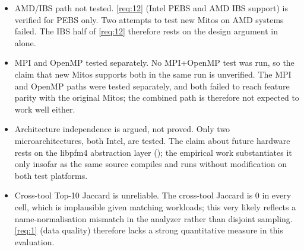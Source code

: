 \begin{itemize}
    \item AMD/IBS path not tested. \ref{req:12} (Intel PEBS and AMD IBS support) is verified for PEBS only. Two attempts to test new Mitos on AMD systems failed. The IBS half of \ref{req:12} therefore rests on the design argument in  alone.
    \item MPI and OpenMP tested separately. No MPI+OpenMP test was run, so the claim that new Mitos supports both in the same run is unverified. The MPI and OpenMP paths were tested separately, and both failed to reach feature parity with the original Mitos; the combined path is therefore not expected to work well either.
    \item Architecture independence is argued, not proved. Only two microarchitectures, both Intel, are tested. The claim about future hardware rests on the libpfm4 abstraction layer (); the empirical work substantiates it only insofar as the same source compiles and runs without modification on both test platforms.
    \item Cross-tool Top-10 Jaccard is unreliable. The cross-tool Jaccard is 0 in every cell, which is implausible given matching workloads; this very likely reflects a name-normalisation mismatch in the analyzer rather than disjoint sampling. \ref{req:1} (data quality) therefore lacks a strong quantitative measure in this evaluation.
\end{itemize}